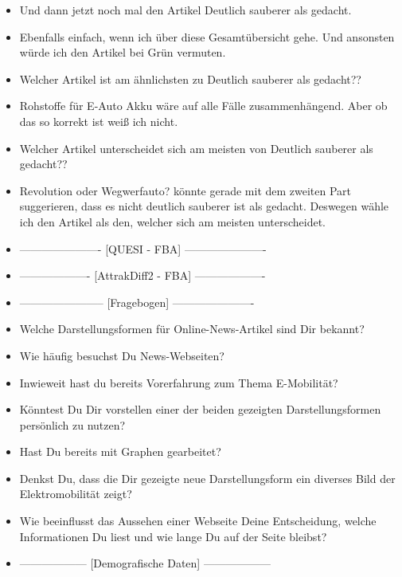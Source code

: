{\begin{itemize}[]
        \item {} Und dann jetzt noch mal den Artikel \flqq Deutlich sauberer als gedacht\frqq{}.
        \item {} Ebenfalls einfach, wenn ich über diese Gesamtübersicht gehe.
              Und ansonsten würde ich den Artikel bei Grün vermuten.
        \item {} Welcher Artikel ist am ähnlichsten zu \flqq Deutlich sauberer als gedacht?\frqq{}?
        \item {} \flqq Rohstoffe für E-Auto Akku\frqq{} wäre auf alle Fälle zusammenhängend.
              Aber ob das so korrekt ist weiß ich nicht.
        \item {} Welcher Artikel unterscheidet sich am meisten von \flqq Deutlich sauberer als gedacht?\frqq{}?
        \item {} \flqq Revolution oder Wegwerfauto?\frqq{} könnte gerade mit dem zweiten Part suggerieren, dass es nicht deutlich sauberer ist als gedacht.
              Deswegen wähle ich den Artikel als den, welcher sich am meisten unterscheidet.
        \item {----------------------} [QUESI - FBA] {----------------------}
        \item {-------------------} [AttrakDiff2 - FBA] {-------------------}
        \item {-----------------------} [Fragebogen] {----------------------}
        \item {} Welche Darstellungsformen für Online-News-Artikel sind Dir bekannt?
        \item {} Wie häufig besuchst Du News-Webseiten?
        \item {} Inwieweit hast du bereits Vorerfahrung zum Thema E-Mobilität?
        \item {} Könntest Du Dir vorstellen einer der beiden gezeigten Darstellungsformen persönlich zu nutzen?
        \item {} Hast Du bereits mit Graphen gearbeitet?
        \item {} Denkst Du, dass die Dir gezeigte neue Darstellungsform ein diverses Bild der Elektromobilität zeigt?
        \item {} Wie beeinflusst das Aussehen einer Webseite Deine Entscheidung, welche Informationen Du liest und wie lange Du auf der Seite bleibst?
        \item {------------------} [Demografische Daten] {------------------}
    \end{itemize}}
\nolinenumbers
